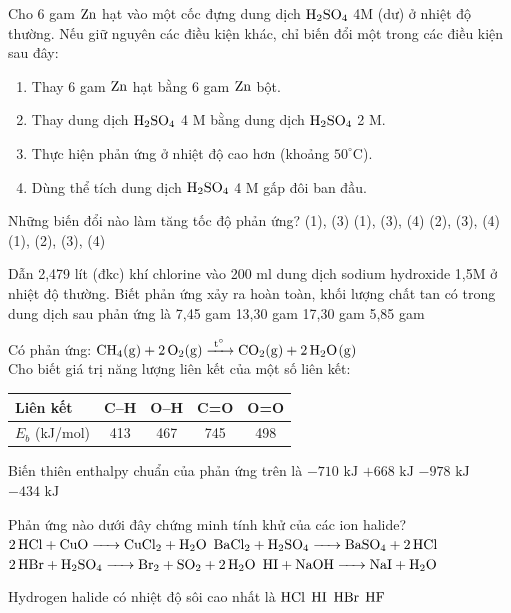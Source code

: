 \documentclass[12pt,a4paper]{article}
\begin{document}
\begin{ex}
Cho 6 gam $\ce{Zn}$ hạt vào một cốc đựng dung dịch $\ce{H2SO4}$ 4M (dư) ở nhiệt độ thường. Nếu giữ nguyên các điều kiện khác, chỉ biến đổi một trong các điều kiện sau đây:
\begin{enumerate}[(1)]
	\item Thay 6 gam $\ce{Zn}$ hạt bằng 6 gam $\ce{Zn}$ bột.
	\item Thay dung dịch $\ce{H2SO4}$ 4 M bằng dung dịch $\ce{H2SO4}$ 2 M.
	\item Thực hiện phản ứng ở nhiệt độ cao hơn (khoảng $50^\circ\text{C}$).
	\item Dùng thể tích dung dịch $\ce{H2SO4}$ 4 M gấp đôi ban đầu.
\end{enumerate}
Những biến đổi nào làm tăng tốc độ phản ứng?
\choice
{(1), (3)}
{(1), (3), (4)}
{(2), (3), (4)}
{(1), (2), (3), (4)}
\end{ex}

\begin{ex}
Dẫn 2,479 lít (đkc) khí chlorine vào 200 ml dung dịch sodium hydroxide 1,5M ở nhiệt độ thường. Biết phản ứng xảy ra hoàn toàn, khối lượng chất tan có trong dung dịch sau phản ứng là
\choice
{7,45 gam}
{13,30 gam}
{17,30 gam}
{5,85 gam}
\end{ex}

\begin{ex}
Có phản ứng: $\ce{CH4(g) + 2O2(g) ->[t^\circ] CO2(g) + 2H2O(g)}$\\
Cho biết giá trị năng lượng liên kết của một số liên kết:
\begin{center}
\begin{tabular}{|l|c|c|c|c|}
\hline
Liên kết & C--H & O--H & C=O & O=O \\ \hline
$E_b$ (kJ/mol) & 413 & 467 & 745 & 498 \\ \hline
\end{tabular}
\end{center}
Biến thiên enthalpy chuẩn của phản ứng trên là
\choice
{$-710\text{ kJ}$}
{$+668\text{ kJ}$}
{$-978\text{ kJ}$}
{$-434\text{ kJ}$}
\end{ex}

\begin{ex}
Phản ứng nào dưới đây chứng minh tính khử của các ion halide?
\choice
{$\ce{2HCl + CuO -> CuCl2 + H2O}$}
{$\ce{BaCl2 + H2SO4 -> BaSO4 + 2HCl}$}
{$\ce{2HBr + H2SO4 -> Br2 + SO2 + 2H2O}$}
{$\ce{HI + NaOH -> NaI + H2O}$}
\end{ex}

\begin{ex}
Hydrogen halide có nhiệt độ sôi cao nhất là
\choice
{$\ce{HCl}$}
{$\ce{HI}$}
{$\ce{HBr}$}
{$\ce{HF}$}
\end{ex}
\end{document}
